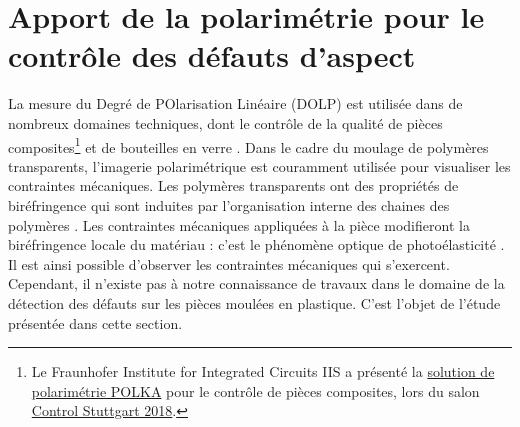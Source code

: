 
\bigskip

\bigskip


\newpage
\section{Apport de la polarimétrie pour le contrôle des défauts d'aspect} \label{subsec:polarimetry}
La mesure du Degré de POlarisation Linéaire (DOLP) est utilisée dans de nombreux domaines techniques, dont le contrôle de la qualité de pièces composites\footnote{Le Fraunhofer Institute for Integrated Circuits IIS a présenté la \href{https://www.iis.fraunhofer.de/en/ff/sse/ims/tech/polarisationskamera.html}{solution de polarimétrie POLKA} pour le contrôle de pièces composites, lors du salon \href{https://www.control-messe.de/en/}{Control Stuttgart 2018}.} et de bouteilles en verre \cite{atkinson_highsensitivity_2018}.
Dans le cadre du moulage de polymères transparents, l'imagerie polarimétrique est couramment utilisée pour visualiser les contraintes mécaniques.
Les polymères transparents ont des propriétés de biréfringence qui sont induites par l'organisation interne des chaines des polymères \cite{denizart_thermal_1995}.
Les contraintes mécaniques appliquées à la pièce modifieront la biréfringence locale du matériau : c'est le phénomène optique de photoélasticité \cite{brewster_experiments_1833}.
Il est ainsi possible d'observer les contraintes mécaniques qui s'exercent.
Cependant, il n'existe pas à notre connaissance de travaux dans le domaine de la détection des défauts sur les pièces moulées en plastique.
C'est l'objet de l'étude présentée dans cette section.

